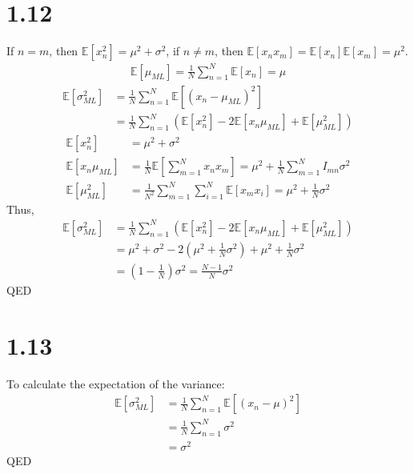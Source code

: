 \documentclass[10pt,a4paper,draft]{book}
\begin{document}
\section*{1.12}
If $n=m$, then $\mathbb{E}[x_n^2] = \mu^2 + \sigma^2$, if $n\neq m$, then $\mathbb{E}[x_nx_m] = \mathbb{E}[x_n]\mathbb{E}[x_m] = \mu^2$.
\begin{equation}
\begin{aligned}
\mathbb{E}[\mu_{ML}] = \frac{1}{N}\sum_{n=1}^{N}\mathbb{E}[x_n] = \mu
\end{aligned}
\end{equation}
\begin{equation}
\begin{aligned}
\mathbb{E}[\sigma^2_{ML}] &= \frac{1}{N}\sum_{n=1}^{N}\mathbb{E}[(x_n-\mu_{ML})^2] \\
&= \frac{1}{N}\sum_{n=1}^{N}(\mathbb{E}[x_n^2] - 2 \mathbb{E}[x_n\mu_{ML}]+\mathbb{E}[\mu_{ML}^2])
\end{aligned}
\end{equation}
\begin{equation}
\begin{aligned}
\mathbb{E}[x_n^2] &= \mu^2 + \sigma^2 \\
\mathbb{E}[x_n\mu_{ML}] &= \frac{1}{N}\mathbb{E}[\sum_{m=1}^{N}x_nx_m] = \mu^2 + \frac{1}{N}\sum_{m=1}^{N} I_{mn}\sigma^2 \\
\mathbb{E}[\mu_{ML}^2] &= \frac{1}{N^2}\sum_{m=1}^{N}\sum_{i=1}^{N} \mathbb{E}[x_mx_i] = \mu^2 + \frac{1}{N}\sigma^2
\end{aligned}
\end{equation}
Thus,
\begin{equation}
\begin{aligned}
\mathbb{E}[\sigma^2_{ML}] &= \frac{1}{N}\sum_{n=1}^{N}(\mathbb{E}[x_n^2] - 2 \mathbb{E}[x_n\mu_{ML}]+\mathbb{E}[\mu_{ML}^2]) \\
&= \mu^2+\sigma^2 - 2(\mu^2 + \frac{1}{N}\sigma^2) + \mu^2 + \frac{1}{N}\sigma^2 \\
&= (1-\frac{1}{N})\sigma^2 = \frac{N-1}{N}\sigma^2
\end{aligned}
\end{equation}
QED

\section*{1.13}
To calculate the expectation of the variance:
\begin{equation}
\begin{aligned}
\mathbb{E}[\sigma^2_{ML}] &= \frac{1}{N}\sum_{n=1}^N \mathbb{E}[(x_n-\mu)^2] \\
&= \frac{1}{N} \sum_{n=1}^N \sigma^2 \\
&= \sigma^2
\end{aligned}
\end{equation}
QED
\end{document}

